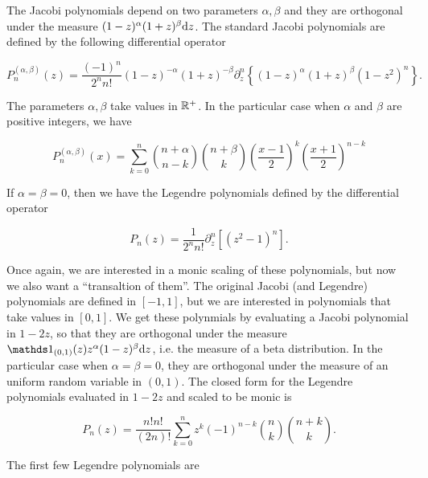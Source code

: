     The Jacobi polynomials depend on two parameters $\alpha,\beta$ and they are orthogonal under the measure $(1-z)^{\alpha}(1+z)^{\beta}\mathrm d z$. The standard Jacobi polynomials are defined by the following differential operator

    \begin{equation*}
        P_{n}^{(\alpha ,\beta )}(z) = \frac{(-1)^{n}}{2^{n}n!}(1-z)^{-\alpha }(1+z)^{-\beta }\partial_z^n \left\{(1-z)^{\alpha }(1+z)^{\beta }\left(1-z^{2}\right)^{n}\right\}.
    \end{equation*}

    The parameters $\alpha,\beta$ take values in $\mathbb R^+$. In the particular case when $\alpha$ and $\beta$ are positive integers, we have

    \begin{equation} \label{eq:jacobi_standard}
        P_n^{(\alpha, \beta)}(x) = \sum_{k=0}^{n} \binom{n+\alpha}{n-k} \binom{n+\beta}{k} \left( \frac{x-1}{2} \right)^k \left( \frac{x+1}{2} \right)^{n-k}
    \end{equation}
    
    
    If $\alpha = \beta = 0$, then we have the Legendre polynomials defined by the differential operator

    \begin{equation*}
        P_{n}(z) = \frac{1}{2^{n}n!}\partial_z^n [(z^{2}-1)^{n}].
    \end{equation*}

    Once again, we are interested in a monic scaling of these polynomials, but now we also want a ``transaltion of them''. The original Jacobi (and Legendre) polynomials are defined in $[-1,1]$, but we are interested in polynomials that take values in $[0,1]$. We get these polynmials by evaluating a Jacobi polynomial in $1-2z$, so that they are orthogonal under the measure $\mathds 1_{(0,1)}(z)z^\alpha(1-z)^\beta \d z$, i.e. the measure of a beta distribution. In the particular case when $\alpha = \beta = 0$, they are orthogonal under the measure of an uniform random variable in $(0,1)$. The closed form for the Legendre polynomials evaluated in $1-2z$ and scaled to be monic is

    \begin{equation*}
        P_n(z) =\frac{n!n!}{(2n)!}\sum_{k=0}^n z^k(-1)^{n-k} \binom nk \binom{n+k}k.
    \end{equation*}

    The first few Legendre polynomials are

